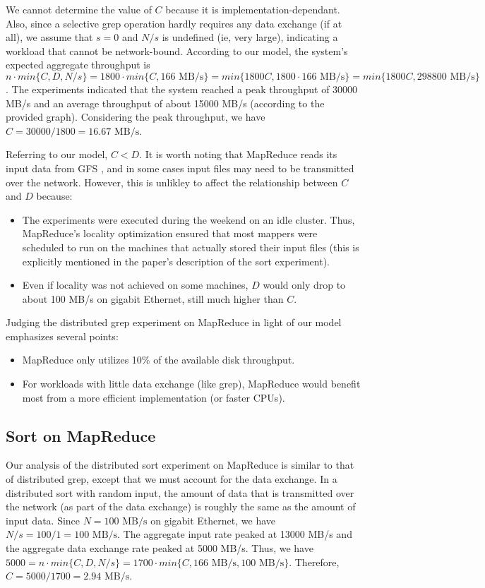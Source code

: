 \documentclass{acm_proc_article-sp}
\begin{document}
We cannot determine the value of $C$ because it is implementation-dependant. Also, since a selective grep operation hardly requires any data exchange (if at all), we assume that $s = 0$ and $N/s$ is undefined (ie, very large), indicating a workload that cannot be network-bound. According to our model, the system's expected aggregate throughput is $n \cdot min\{C, D, N/s\} = 1800 \cdot min\{C, 166 \text{ MB/s}\} = min\{1800C, 1800 \cdot 166 \text{ MB/s}\} = min\{1800C, 298800 \text{ MB/s}\}$. The experiments indicated that the system reached a peak throughput of 30000 MB/s and an average throughput of about 15000 MB/s (according to the provided graph). Considering the peak throughput, we have $C=30000/1800=16.67\text{ MB/s}$. 

Referring to our model, $C < D$. It is worth noting that MapReduce reads its input data from GFS \cite{gfs}, and in some cases input files may need to be transmitted over the network. However, this is unlikley to affect the relationship between $C$ and $D$ because:
\begin{itemize}
  \item The experiments were executed during the weekend on an idle cluster. Thus, MapReduce's locality optimization ensured that most mappers were scheduled to run on the machines that actually stored their input files (this is explicitly mentioned in the paper's description of the sort experiment).
  \item Even if locality was not achieved on some machines, $D$ would only drop to about 100 MB/s on gigabit Ethernet, still much higher than $C$.
\end{itemize}

Judging the distributed grep experiment on MapReduce in light of our model emphasizes several points:
\begin{itemize}
  \item MapReduce only utilizes 10\% of the available disk throughput.
  \item For workloads with little data exchange (like grep), MapReduce would benefit most from a more efficient implementation (or faster CPUs).
\end{itemize}

\subsection{Sort on MapReduce}
Our analysis of the distributed sort experiment on MapReduce is similar to that of distributed grep, except that we must account for the data exchange. In a distributed sort with random input, the amount of data that is transmitted over the network (as part of the data exchange) is roughly the same as the amount of input data. Since $N = 100 \text{ MB/s}$ on gigabit Ethernet, we have $N/s = 100/1 = 100 \text{ MB/s}$. The aggregate input rate peaked at 13000 MB/s and the aggregate data exchange rate peaked at 5000 MB/s. Thus, we have $5000 = n \cdot min\{C, D, N/s\} = 1700 \cdot min\{C, 166 \text{ MB/s}, 100 \text{ MB/s}\}$. Therefore, $C = 5000/1700 = 2.94 \text{ MB/s}$.
\end{document}
